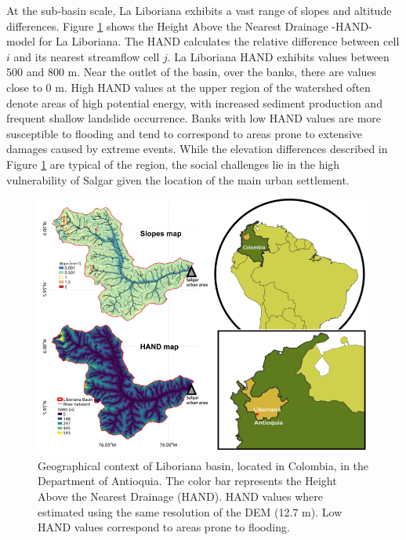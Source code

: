 \documentclass[hess, manuscript]{copernicus}
\begin{document}

At the sub-basin scale, La Liboriana exhibits a vast range of slopes and altitude differences.  Figure \ref{fig:Ubicacion} shows the Height Above the Nearest Drainage -HAND- model   \citep{Renno2008} for La Liboriana. The HAND calculates the relative difference between cell $i$ and its nearest streamflow cell $j$.  La Liboriana HAND exhibits values between 500 and 800 $\text{m}$. Near the outlet of the basin, over the banks, there are values close to 0 m.  High HAND values at the upper region of the watershed often denote areas of high potential energy, with increased sediment production and frequent shallow landslide occurrence.  Banks with low HAND values are more susceptible to flooding and tend to correspond to areas prone to extensive damages caused by extreme events.  While the elevation differences described in Figure \ref{fig:Ubicacion} are typical of the region, the social challenges lie in the high vulnerability of Salgar given the location of the main urban settlement.\\ 

\begin{figure}[t]
\centering
    \includegraphics[width=12cm]{Figures/UbicacionV2.png}
    \caption{Geographical context of Liboriana basin,  located in Colombia, in the Department of Antioquia.  The color bar represents the Height Above the Nearest Drainage (HAND).  HAND values where estimated using the same resolution of the DEM (12.7 $\text{m}$).  Low HAND values correspond to areas prone to flooding.}
    \label{fig:Ubicacion}
\end{figure}
\end{document}
